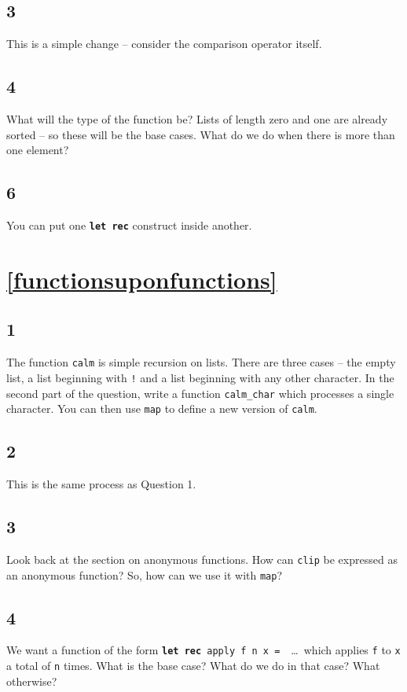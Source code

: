 \documentclass[]{book}
\newcommand\upquote[1]{\textquotesingle#1\textquotesingle}
\begin{document}
\subsection*{3}
This is a simple change -- consider the comparison operator itself.

\subsection*{4}
What will the type of the function be? Lists of length zero and one are already sorted -- so these will be the base cases. What do we do when there is more than one element?

\subsection*{6}
You can put one \texttt{\textbf{let rec}} construct inside another.

\section*{\ref{functionsuponfunctions}\\ }
\subsection*{1}
The function \texttt{calm} is simple recursion on lists. There are three cases -- the empty list, a list beginning with \texttt{\upquote{!}} and a list beginning with any other character. In the second part of the question, write a function \texttt{calm\_char} which processes a single character. You can then use \texttt{map} to define a new version of \texttt{calm}.

\subsection*{2}
This is the same process as Question 1.

\subsection*{3}
Look back at the section on anonymous functions. How can \texttt{clip} be expressed as an anonymous function? So, how can we use it with \texttt{map}?

\subsection*{4}
We want a function of the form \texttt{\textbf{let rec}\! apply\! f\! n\! x\! =}\ \!\ \ldots\ which applies \texttt{f} to \texttt{x} a total of \texttt{n} times. What is the base case? What do we do in that case? What otherwise?
\end{document}
